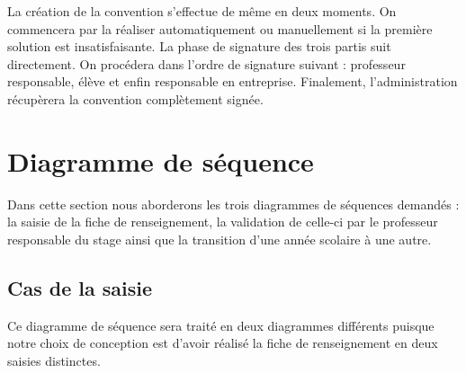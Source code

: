 \documentclass{scrreprt}
\begin{document}

\newpage
	La création de la convention s'effectue de même en deux moments. On commencera par la réaliser 
automatiquement ou manuellement si la première solution est insatisfaisante. La phase de signature des trois
partis suit directement. On procédera dans l'ordre de signature suivant : professeur responsable, élève 
et enfin responsable en entreprise. Finalement, l'administration récupèrera la convention complètement signée.


\newpage
\chapter{Diagramme de séquence}

	Dans cette section nous aborderons les trois diagrammes de séquences demandés : la saisie de la fiche de renseignement,
la validation de celle-ci par le professeur responsable du stage ainsi que la transition d'une année scolaire à une autre.

\newpage
\section{Cas de la saisie}

	Ce diagramme de séquence sera traité en deux diagrammes différents puisque notre choix de conception est d'avoir réalisé
la fiche de renseignement en deux saisies distinctes.
\end{document}
